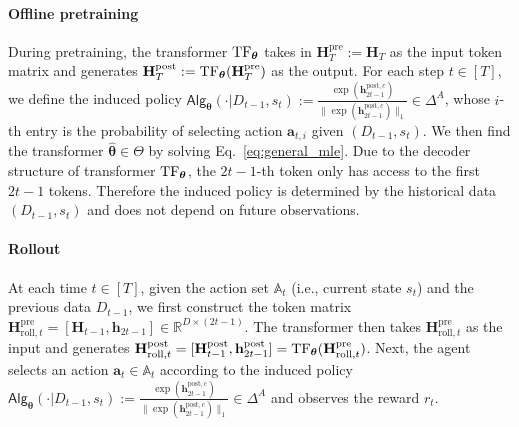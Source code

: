 \documentclass[10pt]{article}
\newcommand{\<}{\left\langle}
\renewcommand{\>}{\right\rangle}
\newcommand{\TF}{{\rm TF}}
\newcommand{\R}{\mathbb{R}}
\newcommand{\pre}{{\mathrm{pre}}}
\newcommand{\post}{{\mathrm{post}}}
\newcommand{\partc}{{c}}
\newcommand{\state}{{s}}
\newcommand{\totlen}{{T}}
\newcommand{\sAlg}{{\mathsf{Alg}}}
\newcommand{\dset}{{D}}
\newcommand{\esttfpar}{{\widehat{\btheta}}}
\newcommand{\tfpar}{{\btheta}}
\newcommand{\tfparspace}{{\Theta}}
\newcommand{\roll}{{\mathrm{roll}}}
\def\sA{{\mathbb{A}}}
\def\bH{{\mathbf H}}
\def\btheta{{\boldsymbol \theta}}
\def\ba{{\mathbf a}}
\def\bh{{\mathbf h}}
\begin{document}
\paragraph{Offline pretraining}
During pretraining, the transformer $\TF_\tfpar$ takes in   $\bH_\totlen^\pre:=\bH_\totlen$ as the input token matrix and generates $\bH_\totlen^\post:=\TF_\tfpar(\bH_\totlen^\pre)$ as the output. For each step $t\in[\totlen]$, we define the  induced policy  $\sAlg_\tfpar(\cdot|\dset_{t-1},\state_t):=\frac{\exp(\bh^{\post,\partc}_{2t-1})}{\|\exp(\bh^{\post,\partc}_{2t-1})\|_1}\in\Delta^A$, whose $i$-th entry is the probability of selecting action $\ba_{t,i}$ given $(\dset_{t-1},\state_t)$. We then find the transformer $\esttfpar\in\tfparspace$ by solving Eq.~\eqref{eq:general_mle}.
Due to the decoder structure of transformer $\TF_\tfpar$, the $2t-1$-th token only has access to the first $2t-1$ tokens. Therefore the induced policy is  determined by the historical data $(\dset_{t-1},\state_t)$ and does not depend on future observations.
\paragraph{Rollout}
At each time $t\in[\totlen]$, given the action set $\sA_t$ (i.e., current state $\state_t$) and the previous data $\dset_{t-1}$, we first construct the token matrix $\bH^{\pre}_{\roll,t}=[\bH_{t-1},\bh_{2t-1}]\in\R^{D\times (2t-1)}$.   The transformer then takes $\bH^{\pre}_{\roll,t}$ as the input  and generates $\bH^{\post}_{\roll,t}=[\bH^{\post}_{t-1},\bh^{\post}_{2t-1}]=\TF_\tfpar(\bH^{\pre}_{\roll,t})$. Next,  the agent selects an action $\ba_t\in\sA_t$ according to the induced  policy $\sAlg_\tfpar(\cdot|\dset_{t-1},\state_t):=\frac{\exp(\bh^{\post,\partc}_{2t-1})}{\|\exp(\bh^{\post,\partc}_{2t-1})\|_1}\in\Delta^A$ and observes the reward $r_t$.
\end{document}

